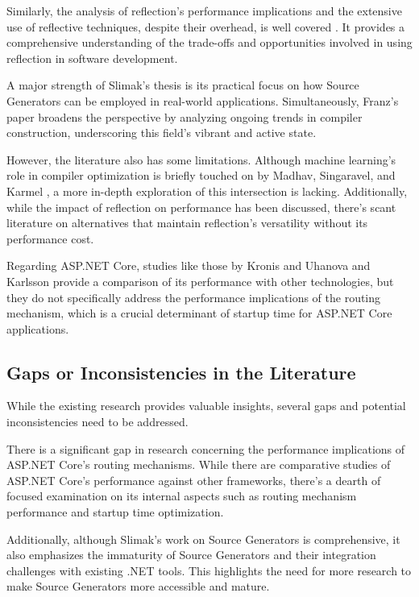 Similarly, the analysis of reflection's performance implications and the extensive use of reflective techniques, despite their overhead, is well covered \cite{Tudose2013, Beaumont2022}. It provides a comprehensive understanding of the trade-offs and opportunities involved in using reflection in software development.

A major strength of Slimak's thesis \cite{Slimak2022} is its practical focus on how Source Generators can be employed in real-world applications. Simultaneously, Franz's paper \cite{Franz2022} broadens the perspective by analyzing ongoing trends in compiler construction, underscoring this field's vibrant and active state.

However, the literature also has some limitations. Although machine learning's role in compiler optimization is briefly touched on by Madhav, Singaravel, and Karmel \cite{Shreyas2021}, a more in-depth exploration of this intersection is lacking. Additionally, while the impact of reflection on performance has been discussed, there's scant literature on alternatives that maintain reflection's versatility without its performance cost.

Regarding ASP.NET Core, studies like those by Kronis and Uhanova \cite{Kronis2018} and Karlsson \cite{Karlsson2021} provide a comparison of its performance with other technologies, but they do not specifically address the performance implications of the routing mechanism, which is a crucial determinant of startup time for ASP.NET Core applications.

\subsection{Gaps or Inconsistencies in the Literature}

While the existing research provides valuable insights, several gaps and potential inconsistencies need to be addressed.

There is a significant gap in research concerning the performance implications of ASP.NET Core's routing mechanisms. While there are comparative studies of ASP.NET Core's performance against other frameworks, there's a dearth of focused examination on its internal aspects such as routing mechanism performance and startup time optimization.

Additionally, although Slimak's work on Source Generators \cite{Slimak2022} is comprehensive, it also emphasizes the immaturity of Source Generators and their integration challenges with existing .NET tools. This highlights the need for more research to make Source Generators more accessible and mature.

